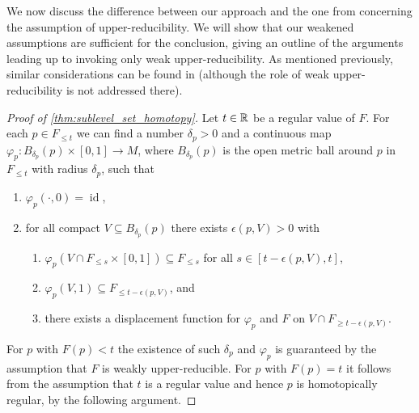 We now discuss the difference between our approach and the one from \cite[Theorem 8.1]{Morse.1938} concerning the assumption of upper-reducibility.
We will show that our weakened assumptions are sufficient for the conclusion, giving an outline of the arguments leading up to \cite[Theorem 8.1]{Morse.1938} invoking only weak upper-reducibility.
As mentioned previously, similar considerations can be found in \cite[Remark II.6.3]{Struwe.1988} (although the role of weak upper-reducibility is not addressed there).
\begin{proof}[Proof of \cref{thm:sublevel_set_homotopy}]
	Let $t \in \mathbb{R}$ be a regular value of $F$.
	For each $p \in F_{\leq t}$ we can find a number $\delta_{p} > 0$ and a continuous map $\varphi_{p} \colon B_{\delta_{p}}(p) \times [0,1] \to M$, where $B_{\delta_{p}}(p)$ is the open metric ball around $p$ in $F_{\leq t}$ with radius $\delta_{p}$, such that
	\begin{enumerate}[label={(\arabic*)}]
		\item \label{item:id} $\varphi_{p}(\cdot,0) = \operatorname{id}$,
		\item \label{item:epsilon} for all compact $V \subseteq B_{\delta_{p}}(p)$ there exists $\epsilon(p,V) > 0$ with
		\begin{enumerate}[label={(\alph*)}]
			\item \label{item:s_below_s} $\varphi_{p}(V \cap F_{\leq s}\times [0,1]) \subseteq F_{\leq s}$ for all $s \in [t - \epsilon(p,V), t]$,
			\item \label{item:contracting} $\varphi_{p}(V,1) \subseteq F_{\leq t - \epsilon(p,V)}$, and
			\item \label{item:displacement} there exists a displacement function for $\varphi_{p}$ and $F$ on $V \cap F_{\geq t - \epsilon(p,V)}$.
		\end{enumerate}
	\end{enumerate}
	For $p$ with $F(p) < t$ the existence of such $\delta_{p}$ and $\varphi_{p}$ is guaranteed by the assumption that $F$ is weakly upper-reducible.
	For $p$ with $F(p) = t$ it follows from the assumption that $t$ is a regular value and hence $p$ is homotopically regular, by the following argument.


\end{proof}
